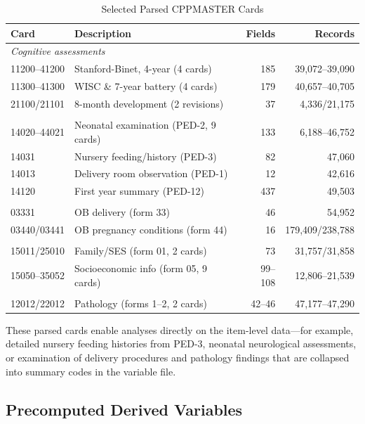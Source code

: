 \documentclass[12pt]{article}
\begin{document}
\begin{table}[H]
\centering
\caption{Selected Parsed CPPMASTER Cards}
\label{tab:parsed}
\small
\begin{tabular}{llrr}
\toprule
Card & Description & Fields & Records \\
\midrule
\multicolumn{4}{l}{\textit{Cognitive assessments}} \\
11200--41200 & Stanford-Binet, 4-year (4 cards) & 185 & 39,072--39,090 \\
11300--41300 & WISC \& 7-year battery (4 cards) & 179 & 40,657--40,705 \\
21100/21101 & 8-month development (2 revisions) & 37 & 4,336/21,175 \\
\addlinespace
\multicolumn{4}{l}{\textit{Pediatric/neonatal}} \\
14020--44021 & Neonatal examination (PED-2, 9 cards) & 133 & 6,188--46,752 \\
14031 & Nursery feeding/history (PED-3) & 82 & 47,060 \\
14013 & Delivery room observation (PED-1) & 12 & 42,616 \\
14120 & First year summary (PED-12) & 437 & 49,503 \\
\addlinespace
\multicolumn{4}{l}{\textit{Obstetric}} \\
03331 & OB delivery (form 33) & 46 & 54,952 \\
03440/03441 & OB pregnancy conditions (form 44) & 16 & 179,409/238,788 \\
\addlinespace
\multicolumn{4}{l}{\textit{Family/SES}} \\
15011/25010 & Family/SES (form 01, 2 cards) & 73 & 31,757/31,858 \\
15050--35052 & Socioeconomic info (form 05, 9 cards) & 99--108 & 12,806--21,539 \\
\addlinespace
\multicolumn{4}{l}{\textit{Pathology}} \\
12012/22012 & Pathology (forms 1--2, 2 cards) & 42--46 & 47,177--47,290 \\
\bottomrule
\end{tabular}
\end{table}

These parsed cards enable analyses directly on the item-level data---for example, detailed nursery feeding histories from PED-3, neonatal neurological assessments, or examination of delivery procedures and pathology findings that are collapsed into summary codes in the variable file.

\subsection{Precomputed Derived Variables}
\end{document}

